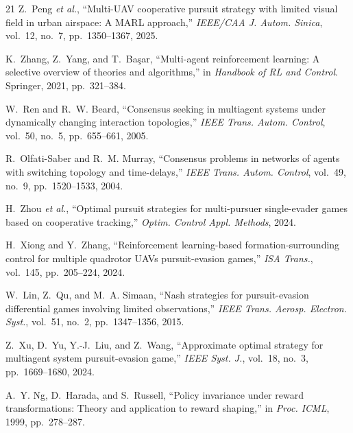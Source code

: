 \documentclass[conference]{IEEEtran}
\begin{document}
\begin{thebibliography}{21}
Z.~Peng \emph{et al.}, ``Multi-UAV cooperative pursuit strategy with limited visual field in urban airspace: A MARL approach,'' \emph{IEEE/CAA J. Autom. Sinica}, vol.~12, no.~7, pp.~1350--1367, 2025.

K.~Zhang, Z.~Yang, and T.~Ba\c{s}ar, ``Multi-agent reinforcement learning: A selective overview of theories and algorithms,'' in \emph{Handbook of RL and Control}. Springer, 2021, pp.~321--384.

W.~Ren and R.~W. Beard, ``Consensus seeking in multiagent systems under dynamically changing interaction topologies,'' \emph{IEEE Trans. Autom. Control}, vol.~50, no.~5, pp.~655--661, 2005.

R.~Olfati-Saber and R.~M. Murray, ``Consensus problems in networks of agents with switching topology and time-delays,'' \emph{IEEE Trans. Autom. Control}, vol.~49, no.~9, pp.~1520--1533, 2004.

H.~Zhou \emph{et al.}, ``Optimal pursuit strategies for multi-pursuer single-evader games based on cooperative tracking,'' \emph{Optim. Control Appl. Methods}, 2024.

H.~Xiong and Y.~Zhang, ``Reinforcement learning-based formation-surrounding control for multiple quadrotor UAVs pursuit-evasion games,'' \emph{ISA Trans.}, vol.~145, pp.~205--224, 2024.

W.~Lin, Z.~Qu, and M.~A. Simaan, ``Nash strategies for pursuit-evasion differential games involving limited observations,'' \emph{IEEE Trans. Aerosp. Electron. Syst.}, vol.~51, no.~2, pp.~1347--1356, 2015.

Z.~Xu, D.~Yu, Y.-J.~Liu, and Z.~Wang, ``Approximate optimal strategy for multiagent system pursuit-evasion game,'' \emph{IEEE Syst. J.}, vol.~18, no.~3, pp.~1669--1680, 2024.

A.~Y. Ng, D.~Harada, and S.~Russell, ``Policy invariance under reward transformations: Theory and application to reward shaping,'' in \emph{Proc. ICML}, 1999, pp.~278--287.

\end{thebibliography}
\end{document}
